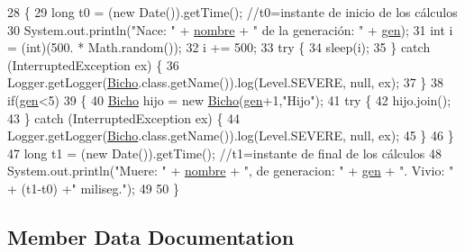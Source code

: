 \begin{DoxyCode}
28                       \{
29         \textcolor{keywordtype}{long} t0 = (\textcolor{keyword}{new} Date()).getTime(); \textcolor{comment}{//t0=instante de inicio de los cálculos}
30         System.out.println(\textcolor{stringliteral}{"Nace: "} + \mbox{\hyperlink{class_ejercicio7_1_1_bicho_aa5bc3fb03f56e116638d14ceb590aecd}{nombre}} + \textcolor{stringliteral}{" de la generación: "} + \mbox{\hyperlink{class_ejercicio7_1_1_bicho_a0cd88157aea1b2436f8328ae67383447}{gen}});
31         \textcolor{keywordtype}{int} i = (int)(500. * Math.random());
32         i += 500;
33         \textcolor{keywordflow}{try} \{
34             sleep(i);
35         \} \textcolor{keywordflow}{catch} (InterruptedException ex) \{
36             Logger.getLogger(\mbox{\hyperlink{class_ejercicio7_1_1_bicho_a03c84eeb81d02ea3573c8380368ab52c}{Bicho}}.class.getName()).log(Level.SEVERE, null, ex);
37         \}
38         \textcolor{keywordflow}{if}(\mbox{\hyperlink{class_ejercicio7_1_1_bicho_a0cd88157aea1b2436f8328ae67383447}{gen}}<5)
39         \{
40             \mbox{\hyperlink{class_ejercicio7_1_1_bicho_a03c84eeb81d02ea3573c8380368ab52c}{Bicho}} hijo = \textcolor{keyword}{new} \mbox{\hyperlink{class_ejercicio7_1_1_bicho_a03c84eeb81d02ea3573c8380368ab52c}{Bicho}}(\mbox{\hyperlink{class_ejercicio7_1_1_bicho_a0cd88157aea1b2436f8328ae67383447}{gen}}+1,\textcolor{stringliteral}{"Hijo"});
41             \textcolor{keywordflow}{try} \{
42                 hijo.join();
43             \} \textcolor{keywordflow}{catch} (InterruptedException ex) \{
44                 Logger.getLogger(\mbox{\hyperlink{class_ejercicio7_1_1_bicho_a03c84eeb81d02ea3573c8380368ab52c}{Bicho}}.class.getName()).log(Level.SEVERE, null, ex);
45             \}
46         \}
47         \textcolor{keywordtype}{long} t1 = (\textcolor{keyword}{new} Date()).getTime(); \textcolor{comment}{//t1=instante de final de los cálculos}
48         System.out.println(\textcolor{stringliteral}{"Muere: "} + \mbox{\hyperlink{class_ejercicio7_1_1_bicho_aa5bc3fb03f56e116638d14ceb590aecd}{nombre}} + \textcolor{stringliteral}{", de generacion: "} + \mbox{\hyperlink{class_ejercicio7_1_1_bicho_a0cd88157aea1b2436f8328ae67383447}{gen}} + \textcolor{stringliteral}{". Vivio: "} + (t1-t0) 
      +\textcolor{stringliteral}{" miliseg."});
49         
50     \}
\end{DoxyCode}


\subsection{Member Data Documentation}
\mbox{\label{class_ejercicio7_1_1_bicho_a0cd88157aea1b2436f8328ae67383447}} 
